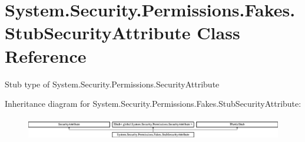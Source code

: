 \hypertarget{class_system_1_1_security_1_1_permissions_1_1_fakes_1_1_stub_security_attribute}{\section{System.\-Security.\-Permissions.\-Fakes.\-Stub\-Security\-Attribute Class Reference}
\label{class_system_1_1_security_1_1_permissions_1_1_fakes_1_1_stub_security_attribute}
}


Stub type of System.\-Security.\-Permissions.\-Security\-Attribute 


Inheritance diagram for System.\-Security.\-Permissions.\-Fakes.\-Stub\-Security\-Attribute\-:\begin{figure}[H]
\begin{center}
\leavevmode
\includegraphics[height=1.009009cm]{class_system_1_1_security_1_1_permissions_1_1_fakes_1_1_stub_security_attribute}
\end{center}
\end{figure}
